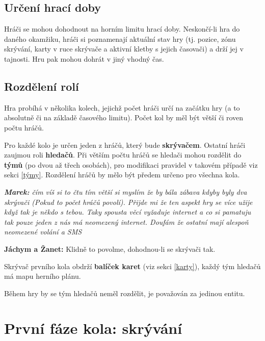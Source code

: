 \documentclass{book}
\newenvironment{reasoning}{\begin{small}\itshape}{\end{small}}
\begin{document}
\subsection{Určení hrací doby}

Hráči se mohou dohodnout na horním limitu hrací doby. Neskončí-li hra do daného okamžiku, hráči si poznamenají aktuální stav hry (tj. pozice, zónu skrývání, karty v ruce skrývače a aktivní kletby s jejich časovači) a drží jej v tajnosti. Hru pak mohou dohrát v jiný vhodný čas.

\subsection{Rozdělení rolí}

Hra probíhá v několika kolech, jejichž počet hráči určí na začátku hry (a to absolutně či na základě časového limitu). Počet kol by měl být větší či roven počtu hráčů.

Pro každé kolo je určen jeden z hráčů, který bude \textbf{skrývačem}. Ostatní hráči zaujmou roli \textbf{hledačů}. Při větším počtu hráčů se hledači mohou rozdělit do \textbf{týmů} (po dvou až třech osobách), pro modifikaci pravidel v takovém případě viz sekci \ref{týmy}. Rozdělení hráčů by mělo být předem určeno pro všechna kola.

\begin{reasoning}
	\textbf{Marek:} čím víš si to čtu tím větší si myslím že by bála zábava kdyby byly dva skrývači (Pokud to počet hráčů povolí). Přijde mi že ten aspekt hry se více užije když tak je někdo s tebou.
	Taky spousta věcí vyžaduje internet a co si pamatuju tak pouze jeden z nás má neomezený internet.
	Doufám že ostatní mají alespoň neomezené volání a SMS

	\textbf{Jáchym a Žanet:} Klidně to povolme, dohodnou-li se skrývači tak.
\end{reasoning}

Skrývač prvního kola obdrží \textbf{balíček karet} (viz sekci \ref{karty}), každý tým hledačů má mapu herního plánu.

Během hry by se tým hledačů neměl rozdělit, je považován za jedinou entitu.

\section{První fáze kola: skrývání}\label{skrývání}
\end{document}
